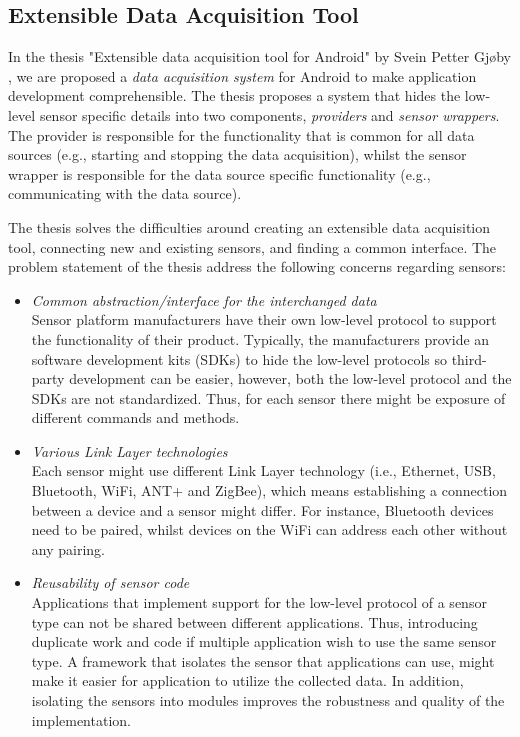 \subsection{Extensible Data Acquisition Tool}
In the thesis "Extensible data acquisition tool for Android" by Svein Petter Gjøby \cite{gjoby}, we are proposed a \textit{data acquisition system} for Android to make application development comprehensible. The thesis proposes a system that hides the low-level sensor specific details into two components, \textit{providers} and \textit{sensor wrappers}. The provider is responsible for the functionality that is common for all data sources (e.g., starting and stopping the data acquisition), whilst the sensor wrapper is responsible for the data source specific functionality (e.g., communicating with the data source).

The thesis solves the difficulties around creating an extensible data acquisition tool, connecting new and existing sensors, and finding a common interface. The problem statement of the thesis address the following concerns regarding sensors:
\begin{itemize}
    \item \textit{Common abstraction/interface for the interchanged data}\\ 
    Sensor platform manufacturers have their own low-level protocol to support the functionality of their product. Typically, the manufacturers provide an software development kits (SDKs) to hide the low-level protocols so third-party development can be easier, however, both the low-level protocol and the SDKs are not standardized. Thus, for each sensor there might be exposure of different commands and methods.
    \item \textit{Various Link Layer technologies} \\ 
    Each sensor might use different Link Layer technology (i.e., Ethernet, USB, Bluetooth, WiFi, ANT+ and ZigBee), which means establishing a connection between a device and a sensor might differ. For instance, Bluetooth devices need to be paired, whilst devices on the WiFi can address each other without any pairing. 
    \item \textit{Reusability of sensor code}\\
    Applications that implement support for the low-level protocol of a sensor type can not be shared between different applications. Thus, introducing duplicate work and code if multiple application wish to use the same sensor type. A framework that isolates the sensor that applications can use, might make it easier for application to utilize the collected data. In addition, isolating the sensors into modules improves the robustness and quality of the implementation. 
    
\end{itemize}

